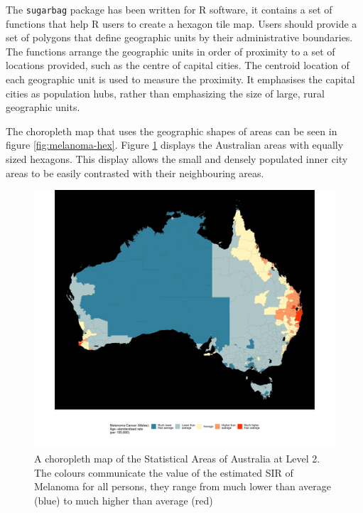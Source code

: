 \documentclass{monashthesis}
\begin{document}
The \texttt{sugarbag} package has been written for R software, it contains a set of functions that help R users to create a hexagon tile map.
Users should provide a set of polygons that define geographic units by their administrative boundaries. The functions arrange the geographic units in order of proximity to a set of locations provided, such as the centre of capital cities.
The centroid location of each geographic unit is used to measure the proximity.
It emphasises the capital cities as population hubs, rather than emphasizing the size of large, rural geographic units.

The choropleth map that uses the geographic shapes of areas can be seen in figure \ref{fig:melanoma-hex}.
Figure \ref{fig:melanoma-geo} displays the Australian areas with equally sized hexagons. This display allows the small and densely populated inner city areas to be easily contrasted with their neighbouring areas.

\begin{figure}[H]
\centering
\includegraphics[width=14cm]{figures/03-algorithm/aus_ggchoro.pdf}
\caption{\label{fig:melanoma-geo}A choropleth map of the Statistical Areas of Australia at Level 2. The colours communicate the value of the estimated SIR of Melanoma for all persons, they range from much lower than average (blue) to much higher than average (red)}
\end{figure}
\end{document}
